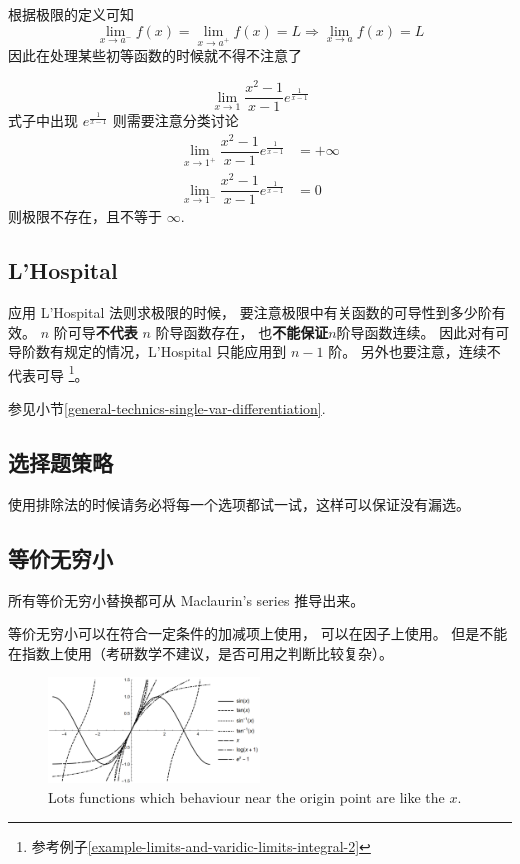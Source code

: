 根据极限的定义可知
\[
    \lim_{x \to a^-} f(x) = \lim_{x \to a^+} f(x) = L 
    \Rightarrow 
    \lim_{x\to a} f(x) = L
\]
因此在处理某些初等函数的时候就不得不注意了
\begin{example}
    \cite[page 9]{yc}
    \[
        \lim_{x \to 1} \dfrac{x^2 - 1}{x-1} e^{\frac{1}{x-1}}
    \]
    式子中出现 $e^{\frac{1}{x-1}}$ 则需要注意分类讨论
    \begin{align*}
        \lim_{x \to 1^+} \dfrac{x^2 - 1}{x-1} e^{\frac{1}{x-1}} &= +\infty\\
        \lim_{x \to 1^-} \dfrac{x^2 - 1}{x-1} e^{\frac{1}{x-1}} &= 0
    \end{align*}
    则极限不存在，且不等于 $\infty$.
\end{example} 

\subsection{L'Hospital}

应用 L'Hospital 法则求极限的时候，
要注意极限中有关函数的可导性到多少阶有效。
$n$ 阶可导\textbf{不代表} $n$ 阶导函数存在，
也\textbf{不能保证}$n$阶导函数连续。
因此对有可导阶数有规定的情况，L'Hospital 只能应用到 $n-1$ 阶。
另外也要注意，连续不代表可导
\footnote{参考例子\ref{example-limits-and-varidic-limits-integral-2}}。

参见小节\ref{general-technics-single-var-differentiation}.

\subsection{选择题策略}

使用排除法的时候请务必将每一个选项都试一试，这样可以保证没有漏选。

\subsection{等价无穷小}  \label{super-small}
所有等价无穷小替换都可从 Maclaurin's series 推导出来。

等价无穷小可以在符合一定条件的加减项上使用，
可以在因子上使用。
但是不能在指数上使用（考研数学不建议，是否可用之判断比较复杂）。

\begin{figure}
  \centering
  \includegraphics[width=0.5\textwidth]{figure/lots-functiuons-like-x-near-0.png}
  \caption{Lots functions which behaviour near the origin point are like the $x$.}
  \label{fig:example}
\end{figure}

